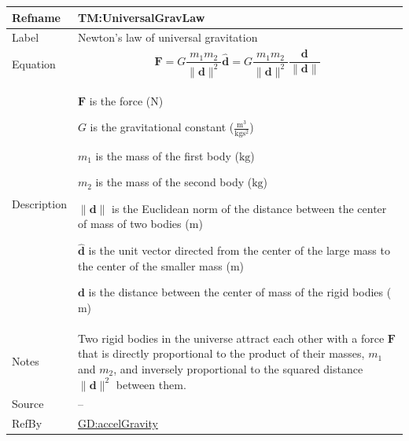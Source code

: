 \documentclass[12pt]{article}
\begin{document}
\begin{minipage}{\textwidth}
\begin{tabular}{>{\raggedright}p{}>{\raggedright\arraybackslash}p{}}
\toprule \textbf{Refname} & \textbf{TM:UniversalGravLaw}
\label{TM:UniversalGravLaw}
\\ \midrule
Label & Newton's law of universal gravitation
        
\\ \midrule
Equation & \begin{displaymath}
           \symbf{F}=G \frac{{m_{1}} {m_{2}}}{\|\symbf{d}\|^{2}} \symbf{\hat{d}}=G \frac{{m_{1}} {m_{2}}}{\|\symbf{d}\|^{2}} \frac{\symbf{d}}{\|\symbf{d}\|}
           \end{displaymath}
\\ \midrule
Description & \begin{symbDescription}
              \item{$\symbf{F}$ is the force (${\text{N}}$)}
              \item{$G$ is the gravitational constant ($\frac{\text{m}^{3}}{\text{kg}\text{s}^{2}}$)}
              \item{${m_{1}}$ is the mass of the first body (${\text{kg}}$)}
              \item{${m_{2}}$ is the mass of the second body (${\text{kg}}$)}
              \item{$\|\symbf{d}\|$ is the Euclidean norm of the distance between the center of mass of two bodies (${\text{m}}$)}
              \item{$\symbf{\hat{d}}$ is the unit vector directed from the center of the large mass to the center of the smaller mass (${\text{m}}$)}
              \item{$\symbf{d}$ is the distance between the center of mass of the rigid bodies (${\text{m}}$)}
              \end{symbDescription}
\\ \midrule
Notes & Two rigid bodies in the universe attract each other with a force $\symbf{F}$ that is directly proportional to the product of their masses, ${m_{1}}$ and ${m_{2}}$, and inversely proportional to the squared distance ${\|\symbf{d}\|^{2}}$ between them.
        
\\ \midrule
Source & --
         
\\ \midrule
RefBy & \hyperref[GD:accelGravity]{GD:accelGravity}
        
\\ \bottomrule
\end{tabular}
\end{minipage}
\end{document}
